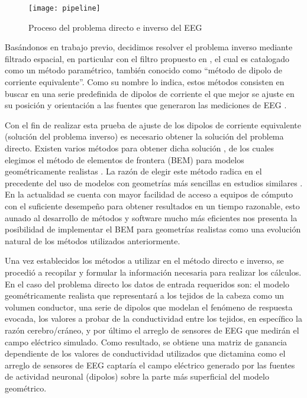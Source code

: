 \begin{figure}[tb]
	\centering
	\texttt{[image: pipeline]}
	\caption{Proceso del problema directo e inverso del EEG
		}
	\label{fig:methodology:pipeline}
\end{figure}

Basándonos en trabajo previo, decidimos resolver el problema inverso mediante filtrado espacial, en particular con el filtro propuesto en \cite{VanVeen1988}, el cual es catalogado como un método paramétrico, también conocido como ``método de dipolo de corriente equivalente''.
Como su nombre lo indica, estos métodos consisten en buscar en una serie predefinida de dipolos de corriente el que mejor se ajuste en su posición y orientación a las fuentes que generaron las mediciones de EEG  \cite{Hallez2007}.

Con el fin de realizar esta prueba de ajuste de los dipolos de corriente equivalente (solución del problema inverso) es necesario obtener la solución del problema directo. Existen varios métodos para obtener dicha solución \cite{Mosher1999}, de los cuales elegimos el método de elementos de frontera (BEM) para modelos geométricamente realistas \cite{Ermer2001}.
La razón de elegir este método radica en el precedente del uso de modelos con geometrías más sencillas en estudios similares \cite{Gutierrez2004}.
En la actualidad se cuenta con mayor facilidad de acceso a equipos de cómputo con el suficiente desempeño para obtener resultados en un tiempo razonable, esto aunado al desarrollo de métodos y software mucho más eficientes \cite{open,Clerc2010} nos presenta la posibilidad de implementar el BEM para geometrías realistas como una evolución natural de los métodos utilizados anteriormente.

Una vez establecidos los métodos a utilizar en el método directo e inverso, se procedió a recopilar y formular la información necesaria para realizar los cálculos.
En el caso del problema directo los datos de entrada requeridos son: el modelo geométricamente realista que representará a los tejidos de la cabeza como un volumen conductor, una serie de dipolos que modelan el fenómeno de respuesta evocada, los valores a probar de la conductividad entre los tejidos, en específico la razón cerebro/cráneo, y por último el arreglo de sensores de EEG que medirán el campo eléctrico simulado.
Como resultado, se obtiene una matriz de ganancia dependiente de los valores de conductividad utilizados que dictamina como el arreglo de sensores de EEG captaría el campo eléctrico generado por las fuentes de actividad neuronal (dipolos) sobre la parte más superficial del modelo geométrico.

